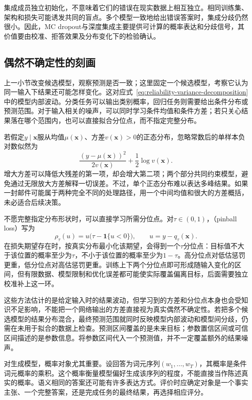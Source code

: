 集成成员独立初始化，不意味着它们的错误在现实数据上相互独立。相同训练集、架构和损失可能诱发共同的盲点。多个模型一致地给出错误答案时，集成分歧仍然很小。因此，MC dropout与深度集成主要提供可计算的概率表达和分歧信号，其价值要由校准、拒答效果及分布变化下的检验确认。

\subsection{偶然不确定性的刻画}
\label{sec:reliability-aleatoric-estimation}

上一小节改变候选模型，观察预测是否一致；这里固定一个候选模型，考察它认为同一输入下结果还可能怎样变化。这对应式~\eqref{eq:reliability-variance-decomposition}中的模型内部波动。分类任务可以输出类别概率，回归任务则需要给出条件分布或预测范围。对于输入相关的噪声，可以同时学习条件均值和条件方差；若只关心结果落在哪个范围内，也可以直接拟合分位点，而不指定完整分布。

若假定$y\mid\bm{x}$服从均值$\mu(\bm{x})$、方差$v(\bm{x})>0$的正态分布，忽略常数后的单样本负对数似然为
\[
 \frac{(y-\mu(\bm{x}))^2}{2v(\bm{x})}
       +\frac12\log v(\bm{x}).
\]
增大方差可以降低大残差的第一项，却会增大第二项；两个部分共同约束模型，避免通过无限放大方差解释一切误差。不过，单个正态分布难以表达多峰结果。如果一封邮件可能属于两种完全不同的处理路径，用一个中间均值和很大的方差概括，未必适合后续决策。

不愿完整指定分布形状时，可以直接学习所需分位点。对$\tau\in(0,1)$，（pinball loss）写为
\[
 \rho_\tau(u)=u\bigl(\tau-\mathbf1\{u<0\}\bigr),
 \qquad u=y-q_\tau(\bm{x}).
\]
在损失期望存在时，按真实分布最小化该期望，会得到一个$\tau$分位点：目标值不大于该位置的概率至少为$\tau$，不小于该位置的概率至少为$1-\tau$。高分位点对低估惩罚更重，低分位点对高估惩罚更重。训练上下两个分位点即可形成随输入变化的区间，但有限数据、模型限制和优化误差都可能使实际覆盖偏离目标，后面需要独立校准补上这一环。

这些方法估计的是给定输入时的结果波动，但学习到的方差和分位点本身也会受知识不足影响，不能把一个网络输出的方差直接视为真实偶然不确定性。若把多个候选模型的结果分布混合，最终预测范围就同时反映模型内部波动和模型间分歧，仍需在未用于拟合的数据上检查。预测区间覆盖的是未来目标；参数置信区间或可信区间描述的是参数信息。将参数区间代入一个预测值，并不一定覆盖额外的结果噪声。

对生成模型，概率对象尤其重要。设回答为词元序列$(w_1,\ldots,w_T)$，其概率是条件词元概率的乘积。这个概率衡量模型偏好生成该序列的程度，不能直接当作陈述真实的概率。语义相同的答案还可能有许多表达方式。评价时应确定对象是一个事实主张、一个完整答案，还是完成任务的最终结果，再选择相应评分。

